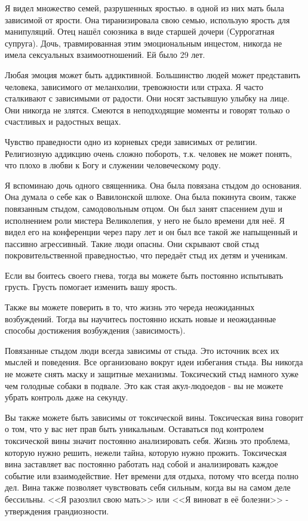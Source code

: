 \documentclass[10pt, fleqn]{article}
\begin{document}
Я видел множество семей, разрушенных яростью. в одной из них мать была зависимой от ярости. Она тиранизировала свою семью, использую ярость для манипуляций. Отец нашёл союзника в виде старшей дочери (Суррогатная супруга). Дочь, травмированная этим эмоциональным инцестом, никогда не имела сексуальных взаимоотношений. Ей было 29 лет.


Любая эмоция может быть аддиктивной. Большинство людей может представить человека, зависимого от меланхолии, тревожности или страха. Я часто сталкивают с зависимыми от радости. Они носят застывшую улыбку на лице. Они никогда не злятся. Смеются в неподходящие моменты и говорят только о счастливых и радостных вещах.

Чувство праведности одно из корневых среди зависимых от религии. Религиозную аддикцию очень сложно побороть, т.к. человек не может понять, что плохо в любви к Богу и служении человеческому роду.

Я вспоминаю дочь одного священника. Она была повязана стыдом до основания. Она думала о себе как о Вавилонской шлюхе. Она была покинута своим, также повязанным стыдом, самодовольным отцом. Он был занят спасением душ и исполнением роли мистера Великолепия, у него не было времени для неё. Я видел его на конференции через пару лет и он был все такой же напыщенный и пассивно агрессивный. Такие люди опасны. Они скрывают свой стыд покровительственной праведностью, что передаёт стыд их детям и ученикам.

Если вы боитесь своего гнева, тогда вы можете быть постоянно испытывать грусть. Грусть помогает изменить вашу ярость.

Также вы можете поверить в то, что жизнь это череда неожиданных возбуждений. Тогда вы научитесь постоянно искать новые и неожиданные способы достижения возбуждения (зависимость).


Повязанные стыдом люди всегда зависимы от стыда. Это источник всех их мыслей и поведения. Все организовано вокруг идеи избегания стыда. Вы никогда не можете снять маску и защитные механизмы. Токсический стыд намного хуже чем голодные собаки в подвале. Это как стая акул-людоедов - вы не можете убрать контроль даже на секунду.


Вы также можете быть зависимы от токсической вины. Токсическая вина говорит о том, что у вас нет прав быть уникальным. Оставаться под контролем токсической вины значит постоянно анализировать себя. Жизнь это проблема, которую нужно решить, нежели тайна, которую нужно прожить. Токсическая вина заставляет вас постоянно работать над собой и анализировать каждое событие или взаимодействие. Нет времени для отдыха, потому что всегда полно дел. Вина также позволяет чувствовать себя сильным, когда вы на самом деле бессильны. <<Я разозлил свою мать>> или <<Я виноват в её болезни>> - утверждения грандиозности.
\end{document}
